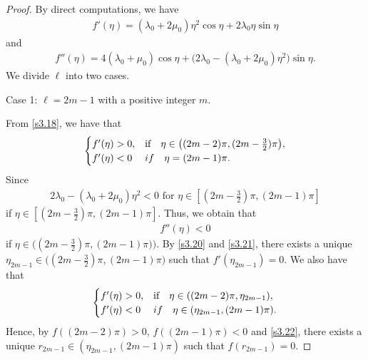 \documentclass[10pt,a4paper]{amsart}
\begin{document}
\begin{proof}
By direct computations, we have
\begin{equation}\label{s3.18}
\begin{aligned}
f'(\eta)=(\lambda_0+2\mu_0)\eta^2\cos\eta+2\lambda_0\eta\sin\eta
\end{aligned}
\end{equation}
and
\begin{equation}\label{s3.19}
\begin{aligned}
f''(\eta)=4(\lambda_0+\mu_0)\cos\eta+\big(2\lambda_0-(\lambda_0+2\mu_0)\eta^2\big)\sin\eta.
\end{aligned}
\end{equation}
We divide $\ell$ into two cases.

\medskip
\noindent
Case 1: $\ell=2m-1$ with a positive integer $m$.

From \eqref{s3.18}, we have that 
\begin{equation}\label{s3.20}
\begin{array}{l}
\begin{cases}
f'(\eta)>0,&\mbox{\rm if}\quad \eta\in\big((2m-2)\pi, (2m-\frac{3}{2})\pi\big),\\
f'(\eta)<0    & {\rm if}\quad \eta=(2m-1)\pi.
\end{cases}
\end{array}
\end{equation}
Since
\begin{equation*}
\begin{aligned}
2\lambda_0-(\lambda_0+2\mu_0)\eta^2<0\,\,\text{for}\,\,\eta\in[(2m-\frac{3}{2})\pi,(2m-1)\pi]
\end{aligned}
\end{equation*}
if $\eta\in[(2m-\frac{3}{2})\pi,(2m-1)\pi]$. Thus, we obtain that
\begin{equation}\label{s3.21}
\begin{aligned}
f''(\eta)<0
\end{aligned}
\end{equation}
if $\eta\in\big((2m-\frac{3}{2})\pi,(2m-1)\pi)\big)$. 
By \eqref{s3.20} and \eqref{s3.21}, there exists a unique $\eta_{2m-1}\in \big((2m-\frac{3}{2})\pi,(2m-1)\pi\big)$ such that $f'(\eta_{2m-1})=0$. We also have that
\begin{equation}\label{s3.22}
\begin{array}{l}
\begin{cases}
f'(\eta)>0,&\mbox{\rm if}\quad \eta\in((2m-2)\pi, \eta_{2m-1}),\\
f'(\eta)<0    & {\rm if}\quad \eta\in(\eta_{2m-1}, (2m-1)\pi).
\end{cases}
\end{array}
\end{equation}
Hence, by $f((2m-2)\pi)> 0$, $f((2m-1)\pi)< 0$ and \eqref{s3.22}, there exists a unique $r_{2m-1}\in (\eta_{2m-1},(2m-1)\pi)$ such that $f(r_{2m-1})=0$.


\end{proof}
\end{document}
